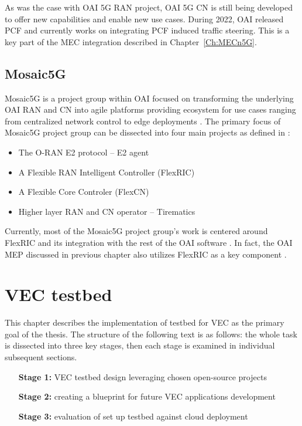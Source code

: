 \documentclass[12pt,a4paper,twoside]{report}
\begin{document}
As was the case with OAI 5G RAN project, OAI 5G CN is still being developed to offer new capabilities and enable new use cases. During 2022, OAI released PCF and currently works on integrating PCF induced traffic steering. This is a key part of the MEC integration described in Chapter~\ref{Ch:MECn5G}.
%
\section{Mosaic5G}
Mosaic5G is a project group within OAI focused on transforming the underlying OAI RAN and CN into agile platforms providing ecosystem for use cases ranging from centralized network control to edge deployments \cite{oai-mosaic5g-web}. The primary focus of Mosaic5G project group can be dissected into four main projects as defined in \cite{oai-mosaic5g-web}:
%
\begin{itemize}
	\item The O-RAN E2 protocol – E2 agent
	\item A Flexible RAN Intelligent Controller (FlexRIC)
	\item A Flexible Core Controler (FlexCN)
	\item Higher layer RAN and CN operator – Tirematics
\end{itemize}
Currently, most of the Mosaic5G project group’s work is centered around FlexRIC and its integration with the rest of the OAI software \cite{oai-mosaic5g-web}. In fact, the OAI MEP discussed in previous chapter also utilizes FlexRIC as a key component \cite{oai-mep-git}. 
\chapter{VEC testbed}
\label{Ch:VEC-tstbed}
This chapter describes the implementation of testbed for VEC as the primary goal of the thesis. The structure of the following text is as follows: the whole task is dissected into three key stages, then each stage is examined in individual subsequent sections.
%
\begin{itemize}[leftmargin=6em]
	\item[\textbf{Stage 1:}] VEC testbed design leveraging chosen open-source projects 
	\item[\textbf{Stage 2:}] creating a blueprint for future VEC applications development
	\item[\textbf{Stage 3:}]  evaluation of set up testbed against cloud deployment
\end{itemize}
%
\end{document}

